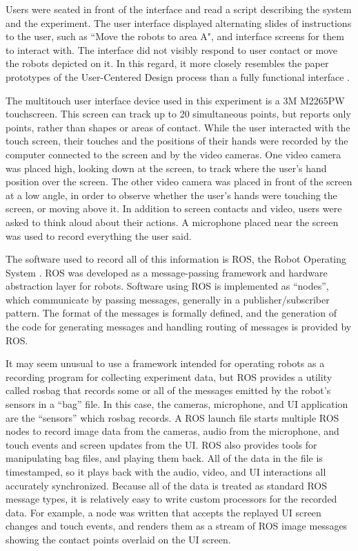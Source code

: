 \documentclass[]{article}
\begin{document}
Users were seated in front of the interface and read a script describing the system and the experiment. The user interface displayed alternating slides of instructions to the user, such as ``Move the robots to area A", and interface screens for them to interact with. 
The interface did not visibly respond to user contact or move the robots depicted on it.
In this regard, it more closely resembles the paper prototypes of the User-Centered Design process than a fully functional interface \cite{ehn1992cardboard}.

The multitouch user interface device used in this experiment is a 3M M2265PW touchscreen. 
This screen can track up to 20 simultaneous points, but reports only points, rather than shapes or areas of contact. 
While the user interacted with the touch screen, their touches and the positions of their hands were recorded by the computer connected to the screen and by the video cameras. 
One video camera was placed high, looking down at the screen, to track where the user's hand position over the screen. 
The other video camera was placed in front of the screen at a low angle, in order to observe whether the user's hands were touching the screen, or moving above it. 
In addition to screen contacts and video, users were asked to think aloud about their actions.
A microphone placed near the screen was used to record everything the user said. 

The software used to record all of this information is ROS, the Robot Operating System \cite{ROS_announcement_paper}. 
ROS was developed as a message-passing framework and hardware abstraction layer for robots. 
Software using ROS is implemented as ``nodes'', which communicate by passing messages, generally in a publisher/subscriber pattern. 
The format of the messages is formally defined, and the generation of the code for generating messages and handling routing of messages is provided by ROS. 

It may seem unusual to use a framework intended for operating robots as a recording program for collecting experiment data, but ROS provides a utility called rosbag that records some or all of the messages emitted by the robot's sensors in a ``bag'' file. 
In this case, the cameras, microphone, and UI application are the ``sensors'' which rosbag records.
A ROS launch file starts multiple ROS nodes to record image data from the cameras, audio from the microphone, and touch events and screen updates from the UI.
ROS also provides tools for manipulating bag files, and playing them back. 
All of the data in the file is timestamped, so it plays back with the audio, video, and UI interactions all accurately synchronized. 
Because all of the data is treated as standard ROS message types, it is relatively easy to write custom processors for the recorded data.
For example, a node was written that accepts the replayed UI screen changes and touch events, and renders them as a stream of ROS image messages showing the contact points overlaid on the UI screen. 
\end{document}
